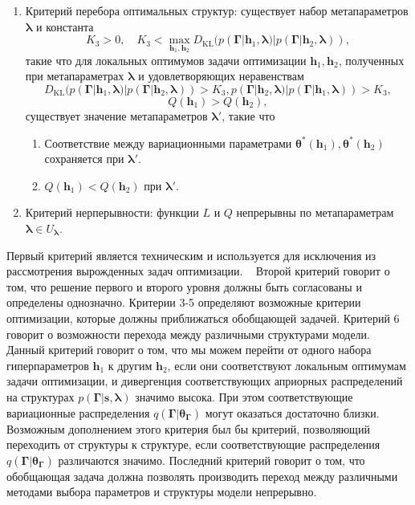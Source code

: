 \begin{defin}
\begin{enumerate}
\item Критерий перебора оптимальных структур: существует набор метапараметров $\boldsymbol{\lambda}$ и константа $$K_3>0, \quad K_3 < \max_{\mathbf{h}_1, \mathbf{h}_2} D_\text{KL}(p (\boldsymbol{\Gamma}|\mathbf{h}_1, \boldsymbol{\lambda}) | p (\boldsymbol{\Gamma}|\mathbf{h}_2, \boldsymbol{\lambda})),$$ такие что для локальных оптимумов задачи оптимизации $\mathbf{h}_{1}, \mathbf{h}_2$, полученных при метапараметрах $\boldsymbol{\lambda}$ и удовлетворяющих неравенствам $$D_\text{KL}(p (\boldsymbol{\Gamma}|\mathbf{h}_1, \boldsymbol{\lambda})| p (\boldsymbol{\Gamma}|\mathbf{h}_2, \boldsymbol{\lambda})) > K_3, p(\boldsymbol{\Gamma}|\mathbf{h}_2, \boldsymbol{\lambda})| p(\boldsymbol{\Gamma}|\mathbf{h}_1, \boldsymbol{\lambda})) > K_3,$$ $$Q(\mathbf{h}_1) > Q(\mathbf{h}_2),$$  существует значение метапараметров $\boldsymbol{\lambda}'$, такие что
\begin{enumerate}
\item Соответствие между вариационными параметрами $\boldsymbol{\theta}^{*}(\mathbf{h}_1), \boldsymbol{\theta}^{*}(\mathbf{h}_2)$ сохраняется при  $\boldsymbol{\lambda}'$.
\item  $Q(\mathbf{h}_1) < Q(\mathbf{h}_2)$ при $\boldsymbol{\lambda}'$.
\end{enumerate}


\item Критерий нерперывности: функции $L$ и $Q$ непрерывны по метапараметрам $\boldsymbol{\lambda} \in U_{\boldsymbol{\lambda}}$.
\end{enumerate}
\end{defin}
Первый критерий является техническим и используется для исключения из рассмотрения вырожденных задач оптимизации.  
Второй критерий говорит о том, что решение первого и второго уровня должны быть согласованы и определены однозначно.
Критерии 3-5 определяют возможные критерии оптимизации, которые должны приближаться обобщающей задачей.
Критерий 6 говорит о возможности перехода между различными структурами модели. Данный критерий говорит о том, что мы можем перейти от одного набора гиперпараметров $\mathbf{h}_1$ к другим $\mathbf{h}_2$, если они соответствуют локальным оптимумам задачи оптимизации, и дивергенция соответствующих априорных  распределений на структурах $p(\boldsymbol{\Gamma}|\mathbf{s}, \boldsymbol{\lambda})$ значимо высока. При этом соответствующие вариационные распределения $q(\boldsymbol{\Gamma}|\boldsymbol{\theta}_{\boldsymbol{\Gamma}})$ могут оказаться достаточно близки. Возможным дополнением этого критерия был бы критерий, позволяющий переходить от структуры к структуре, если соответствующие распределения $q(\boldsymbol{\Gamma}|\boldsymbol{\theta}_{\boldsymbol{\Gamma}})$ различаются значимо.
Последний критерий говорит о том, что обобщающая задача должна позволять производить переход между различными методами выбора  параметров и структуры модели непрерывно.

